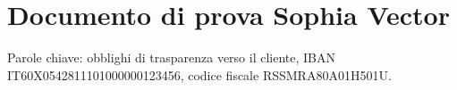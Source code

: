 \documentclass{article}
\begin{document}
\section{Documento di prova Sophia Vector}
Parole chiave: obblighi di trasparenza verso il cliente,
IBAN IT60X0542811101000000123456, codice fiscale RSSMRA80A01H501U.
\end{document}
